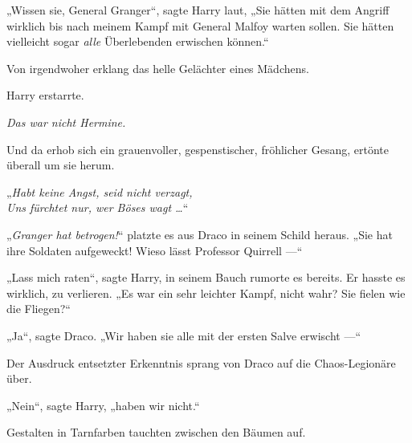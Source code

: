 „Wissen sie, General Granger“, sagte Harry laut,
„Sie hätten mit dem Angriff wirklich bis nach meinem Kampf mit General Malfoy warten sollen. Sie hätten vielleicht sogar \emph{alle} Überlebenden erwischen können.“

Von irgendwoher erklang das helle Gelächter eines Mädchens.

Harry erstarrte.

\emph{Das war nicht Hermine.}

Und da erhob sich ein grauenvoller, gespenstischer, fröhlicher Gesang, ertönte überall um sie herum.

„\emph{Habt keine Angst, seid nicht verzagt,\\
Uns fürchtet nur, wer Böses wagt …}“

„\emph{Granger hat betrogen!}“ platzte es aus Draco in seinem Schild heraus.
„Sie hat ihre Soldaten aufgeweckt! Wieso lässt Professor Quirrell —“

„Lass mich raten“, sagte Harry, in seinem Bauch rumorte es bereits. Er hasste es wirklich, zu verlieren.
„Es war ein sehr leichter Kampf, nicht wahr? Sie fielen wie die Fliegen?“

„Ja“, sagte Draco.
„Wir haben sie alle mit der ersten Salve erwischt —“

Der Ausdruck entsetzter Erkenntnis sprang von Draco auf die Chaos-Legionäre über.

„Nein“, sagte Harry, „haben wir nicht.“

Gestalten in Tarnfarben tauchten zwischen den Bäumen auf.

